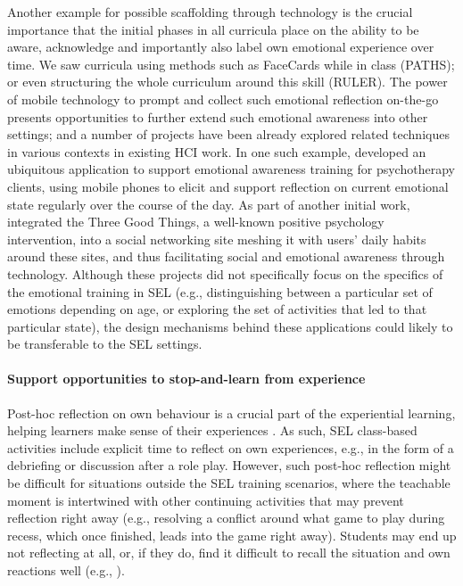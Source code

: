 \documentclass[prodmode,acmtochi]{acmsmall}
\begin{document}
Another example for possible scaffolding through technology is the crucial importance that the initial phases in all curricula place on the ability to be aware, acknowledge and importantly also label own emotional experience over time. We saw curricula using methods such as FaceCards while in class (PATHS); or even structuring the whole curriculum around this skill (RULER). The power of mobile technology to prompt and collect such emotional reflection on-the-go presents opportunities to further extend such emotional awareness into other settings; and a number of projects have been already explored related techniques in various contexts in existing HCI work. In one such example,  developed an ubiquitous application to support emotional awareness training  for psychotherapy clients, using mobile phones to elicit and support reflection on current emotional state regularly over the course of the day. As part of another initial work,  integrated the Three Good Things, a well-known positive psychology intervention, into a social networking site meshing it with users' daily habits around these sites, and thus facilitating social and emotional awareness through technology. 
%
Although these projects did not specifically focus on the specifics of the emotional training in SEL (e.g., distinguishing between a particular set of emotions depending on age, or exploring the set of activities that led to that particular state), the design mechanisms behind these applications could likely to be transferable to the SEL settings. 

\paragraph{Support opportunities to stop-and-learn from experience}
Post-hoc reflection on own behaviour is a crucial part of the experiential learning, helping learners make sense of their experiences \cite{Moon1999,Cohen2001}. As such, SEL class-based activities include explicit time to reflect on own experiences, e.g., in the form of a debriefing or discussion after a role play. However, such post-hoc reflection might be difficult for situations outside the SEL training scenarios, where the teachable moment is intertwined with other continuing activities that may prevent reflection right away (e.g., resolving a conflict around what game to play during recess, which once finished, leads into the game right away). Students may end up not reflecting at all, or, if they do, find it difficult to recall the situation and own reactions well (e.g., \cite[p. 55]{Pasi2001}).
\end{document}
